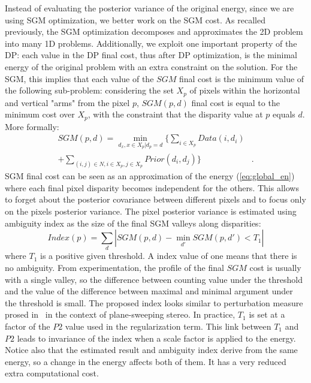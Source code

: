 \documentclass{article}
\begin{document}
Instead of evaluating the posterior variance of the original energy, since we are using SGM optimization, we better work on the SGM cost. As recalled previously, the SGM optimization decomposes and approximates the 2D problem into many 1D problems. Additionally, we exploit one important property of the DP: each value in the DP final cost, thus after DP optimization, is the minimal energy of the original problem with an extra constraint on the solution. For the SGM, this implies that each value of the $SGM$ final cost is the minimum value of the following sub-problem: considering the set $X_p$ of pixels within the horizontal and vertical "arms" from the pixel $p$, $SGM(p,d)$ final cost is equal to the minimum cost over $X_p$, with the constraint that the disparity value at $p$ equals $d$. More formally:
\begin{equation}
\begin{split}
  SGM(p,d) = \min_{d_x, x \in X_p | d_p = d} \{  \sum_{i \in X_p}  Data(i,d_i) & \\
  +  \sum_{(i,j) \in N, i \in X_p, j \in X_p} Prior(d_i,d_j) \}  &.
\end{split}
\end{equation}
SGM final cost can be seen as an approximation of the energy (\ref{eq:global_en}) where each final pixel disparity becomes independent for the others. This allows to forget about the posterior covariance between different pixels and to focus only on the pixels posterior variance. The pixel posterior variance is estimated using ambiguity index as the size of the final SGM valleys along disparities:
\begin{equation}
Index(p) = \sum_{d}{|SGM(p,d) - \min_{d'}{SGM(p,d')} < T_1|}
\end{equation}
where $T_1$ is a positive given threshold. A index value of one means that there is no ambiguity. From experimentation, the profile of the final $SGM$ cost is usually with a single valley, so the difference between counting value under the threshold and the value of the difference between maximal and minimal argument under the threshold is small. The proposed index looks similar to perturbation
measure prosed in~\cite{merrell07} in the context of plane-sweeping stereo. In practice, $T_1$ is set at a factor of the $P2$ value used in the regularization term. This link between $T_1$ and $P2$ leads to invariance of the index when a scale factor is applied to the energy. Notice also that the estimated result and ambiguity index derive from the same energy, so a change in the energy affects both of them. It has a very reduced extra computational cost.
\end{document}
